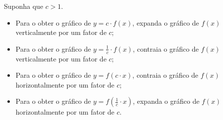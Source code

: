 \begin{obs}
Suponha que $c>1$.
\begin{itemize}
    \item Para o obter o gráfico de $y=c\cdot f(x)$, expanda o gráfico de $f(x)$ verticalmente por um fator de $c$;
    \item Para o obter o gráfico de $y=\frac{1}{c}\cdot f(x)$, contraia o gráfico de $f(x)$ verticalmente por um fator de $c$;
    \item Para o obter o gráfico de $y= f(c\cdot x)$, contraia o gráfico de $f(x)$ horizontalmente por um fator de $c$;
    \item Para o obter o gráfico de $y= f(\frac{1}{c}\cdot x)$, expanda o gráfico de $f(x)$ horizontalmente por um fator de $c$.
\end{itemize}
\end{obs}

